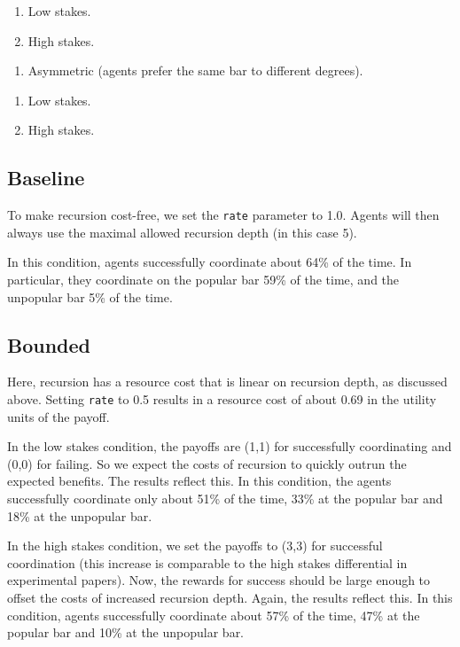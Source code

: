 \begin{enumerate}
\def\labelenumi{\alph{enumi}.}
\itemsep1pt\parskip0pt
\item
  Low stakes.
\item
  High stakes.
\end{enumerate}

\begin{enumerate}
\def\labelenumi{\arabic{enumi}.}
\setcounter{enumi}{3}
\itemsep1pt\parskip0pt
\item
  Asymmetric (agents prefer the same bar to different degrees).
\end{enumerate}

\begin{enumerate}
\def\labelenumi{\alph{enumi}.}
\itemsep1pt\parskip0pt
\item
  Low stakes.
\item
  High stakes.
\end{enumerate}

\subsection{Baseline}\label{baseline}

To make recursion cost-free, we set the \texttt{rate} parameter to 1.0.
Agents will then always use the maximal allowed recursion depth (in this
case 5).

In this condition, agents successfully coordinate about 64\% of the
time. In particular, they coordinate on the popular bar 59\% of the
time, and the unpopular bar 5\% of the time.

\subsection{Bounded}\label{bounded}

Here, recursion has a resource cost that is linear on recursion depth,
as discussed above. Setting \texttt{rate} to 0.5 results in a resource
cost of about 0.69 in the utility units of the payoff.

In the low stakes condition, the payoffs are (1,1) for successfully
coordinating and (0,0) for failing. So we expect the costs of recursion
to quickly outrun the expected benefits. The results reflect this. In
this condition, the agents successfully coordinate only about 51\% of
the time, 33\% at the popular bar and 18\% at the unpopular bar.

In the high stakes condition, we set the payoffs to (3,3) for successful
coordination (this increase is comparable to the high stakes
differential in experimental papers). Now, the rewards for success
should be large enough to offset the costs of increased recursion depth.
Again, the results reflect this. In this condition, agents successfully
coordinate about 57\% of the time, 47\% at the popular bar and 10\% at
the unpopular bar.

